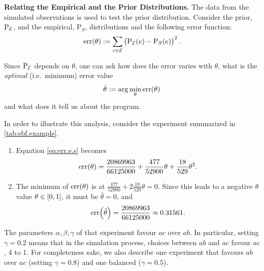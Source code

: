 \documentclass{tlp}
\newcommand{\at}[1]{\ensuremath{\!\del{#1}}}        %
\newcommand{\cla}[1]{\ensuremath{{\cal #1}}}        %
\newcommand{\EVENTSset}{\ensuremath{\cla{E}}}
\newcommand{\err}[1]{\ensuremath{\mathrm{err}\at{#1}}}
\newcommand{\prfunc}{\ensuremath{\mathrm{P}}}
\newcommand{\prd}[1]{\ensuremath{\prfunc_{#1}}}
\newcommand{\prE}{\prd{\EVENTSset}}
\begin{document}
\noindent\textbf{Relating the Empirical and the Prior Distributions.}
The data from the simulated observations is used to test the prior
distribution.  Consider the prior, \(\prE\), and the empirical,
\(\prd{S}\), distributions and the following error function:
\begin{equation}
    \err{\theta} := \sum_{e\in\EVENTSset} \del{\prE\at{e} - \prd{S}\at{e}}^2.\label{eq:err.e.s}
\end{equation}

Since \(\prE\) depends on \(\theta\), one can ask how does the error
varies with \(\theta\), what is the \emph{optimal} (i.e.\ minimum)
error value
\begin{equation}
    \hat{\theta} := \arg\min_\theta \err{\theta}\label{eq:opt.err}
\end{equation}
and what does it tell us about the program.

In order to illustrate this analysis, consider the experiment
summarized in \cref{tab:sbf.example}.

\begin{enumerate}
    \item Equation \eqref{eq:err.e.s} becomes \[
              \err{\theta} = \frac{20869963}{66125000} + \frac{477}{52900}\theta + \frac{18}{529}\theta^2.
          \]
    \item The minimum of \(\err{\theta}\) is at \(\frac{477}{52900} +
          2\frac{18}{529}\theta = 0\).  Since this leads to a negative \(\theta\) value \(\theta \in \intcc{0,1}\), it must be \(\hat{\theta} = 0\), and \[
              \err{\hat{\theta}} = \frac{20869963}{66125000} \approx 0.31561.
          \]
\end{enumerate}

The parameters \(\alpha, \beta, \gamma\) of that experiment favour
\(ac\) over \(ab\).  In particular, setting \(\gamma = 0.2\) means
that in the simulation process, choices between \(ab\) and \(ac\)
favour \(ac\), 4 to 1.  For completeness sake, we also describe one
experiment that favours \(ab\) over \(ac\) (setting \(\gamma=0.8\))
and one balanced (\(\gamma=0.5\)).
\end{document}
